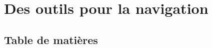 \section{Des outils pour la navigation}

\subsection{Table de matières}

\begin{slide}
  \inputminted{latex}{examples/toc.tex}
\end{slide}

\begin{slide}
  \inputminted{latex}{examples/minitoc.tex}
\end{slide}

